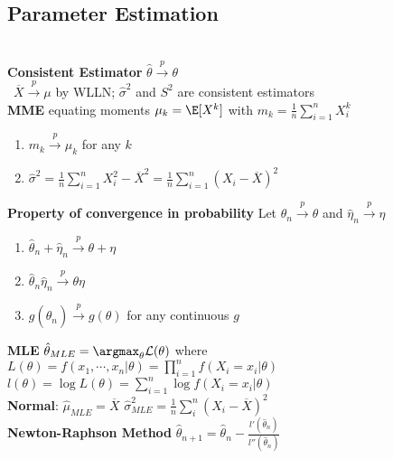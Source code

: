 \documentclass[8pt]{article}
\begin{document}
\begin{multicols}{3}
{  \subsection*{Parameter Estimation}\\
  \textbf{Consistent Estimator} $\hat{\theta} \stackrel{p}{\to} \theta$ \\\
  $\overline{X} \stackrel{p}{\to} \mu$ by WLLN; $\hat{\sigma}^2$ and $S^2$ are consistent estimators\\
  \textbf{MME} equating moments $\mu_k = \E[X^k]$ with $m_k = \frac{1}{n}\sum_{i=1}^n X_i^k$\\
  \begin{enumerate}
      \item $m_k \stackrel{p}{\to} \mu_k$ for any $k$
      \item $\hat{\sigma}^2 = \frac{1}{n}\sum_{i=1}^n X_i^2 - \overline{X}^2 =  \frac{1}{n}\sum_{i=1}^n (X_i - \overline{X})^2$
  \end{enumerate}
  \textbf{Property of convergence in probability}
  Let $\hat{\theta}_n \stackrel{p}{\to} \theta$ and $\hat{\eta}_n \stackrel{p}{\to} \eta$
  \begin{enumerate}
    \item $\hat{\theta}_n + \hat{\eta}_n \stackrel{p}{\to} \theta + \eta$
    \item $\hat{\theta}_n \hat{\eta}_n \stackrel{p}{\to} \theta\eta$
    \item $g(\hat{\theta}_n)\stackrel{p}{\to} g(\theta)$ for any continuous $g$
  \end{enumerate}
  \textbf{MLE} $\hat{\theta}_{MLE} = \argmax_{\theta} \mathcal{L}(\theta)$ where \\
   $L(\theta) = f(x_1, \cdots, x_n|\theta) = \prod_{i=1}^n f(X_i = x_i|\theta)$\\
   $l(\theta) = \log L(\theta) = \sum_{i=1}^n \log f(X_i = x_i |\theta)$\\
   \textbf{Normal}: $\hat{\mu}_{MLE} = \overline{X}$  $\hat{\sigma}^2_{MLE} = \frac{1}{n} \sum_{i}^n (X_i - \overline{X})^2$\\
   \textbf{Newton-Raphson Method} $\hat{\theta}_{n+1} =  \hat{\theta}_n - \frac{l'(\hat{\theta}_n)}{l''(\hat{\theta}_n)}$\\

}
\end{multicols}
\end{document}
